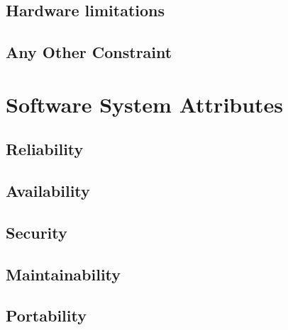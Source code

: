 \subsection{Hardware limitations}
\subsection{Any Other Constraint}

\section{Software System Attributes}

\subsection{Reliability}
\subsection{Availability}
\subsection{Security}
\subsection{Maintainability}
\subsection{Portability}